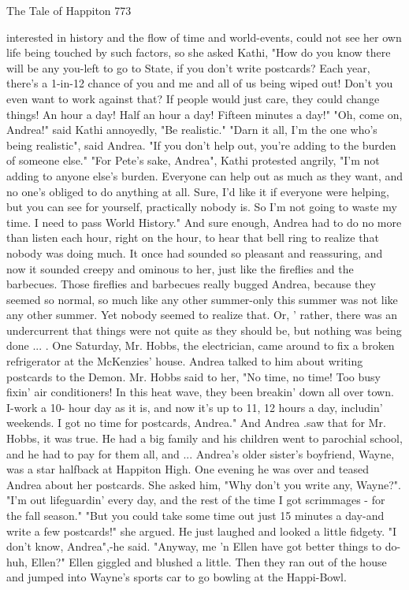 The Tale of Happiton                                                                 773

interested in history and the flow of time and world-events, could not see her own life
being touched by such factors, so she asked Kathi, "How do you know there will be
any you-left to go to State, if you don't write postcards? Each year, there's a 1-in-12
chance of you and me and all of us being wiped out! Don't you even want to work
against that? If people would just care, they could change things! An hour a day! Half
an hour a day! Fifteen minutes a day!"
         "Oh, come on, Andrea!" said Kathi annoyedly, "Be realistic."
         "Darn it all, I'm the one who's being realistic", said Andrea. "If you don't help
out, you're adding to the burden of someone else."
         "For Pete's sake, Andrea", Kathi protested angrily, "I'm not adding to anyone
else's burden. Everyone can help out as much as they want, and no one's obliged to do
anything at all. Sure, I'd like it if everyone were helping, but you can see for yourself,
practically nobody is. So I'm not going to waste my time. I need to pass World
History."
         And sure enough, Andrea had to do no more than listen each hour, right on the
hour, to hear that bell ring to realize that nobody was doing much. It once had
sounded so pleasant and reassuring, and now it sounded creepy and ominous to her,
just like the fireflies and the barbecues. Those fireflies and barbecues really bugged
Andrea, because they seemed so normal, so much like any other summer-only this
summer was not like any other summer. Yet nobody seemed to realize that. Or, '
rather, there was an undercurrent that things were not quite as they should be, but
nothing was being done ...
         . One Saturday, Mr. Hobbs, the electrician, came around to fix a broken
refrigerator at the McKenzies' house. Andrea talked to him about writing postcards to
the Demon. Mr. Hobbs said to her, "No time, no time! Too busy fixin' air
conditioners! In this heat wave, they been breakin' down all over town. I-work a 10-
hour day as it is, and now it's up to 11, 12 hours a day, includin' weekends. I got no
time for postcards, Andrea." And Andrea .saw that for Mr. Hobbs, it was true. He had
a big family and his children went to parochial school, and he had to pay for them all,
and ...
         Andrea's older sister's boyfriend, Wayne, was a star halfback at Happiton
High. One evening he was over and teased Andrea about her postcards. She asked
him, "Why don't you write any, Wayne?".
         "I'm out lifeguardin' every day, and the rest of the time I got scrimmages - for
the fall season."
         "But you could take some time out just 15 minutes a day-and write a few
postcards!" she argued. He just laughed and looked a little fidgety. "I don't know,
Andrea",-he said. "Anyway, me 'n Ellen have got better things to do-huh, Ellen?"
Ellen giggled and blushed a little. Then they ran out of the house and jumped into
Wayne's sports car to go bowling at the Happi-Bowl.


